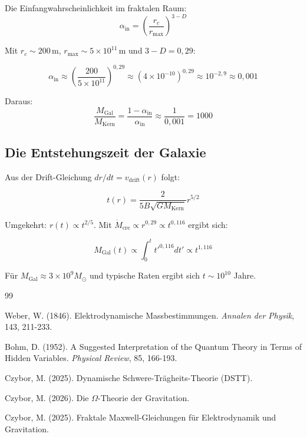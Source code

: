 \documentclass[12pt,a4paper]{article}
\begin{document}
Die Einfangwahrscheinlichkeit im fraktalen Raum:
\[
\alpha_{\text{in}} = \left( \frac{r_c}{r_{\text{max}}} \right)^{3-D}
\]

Mit $r_c \sim 200\,\text{m}$, $r_{\text{max}} \sim 5 \times 10^{11}\,\text{m}$ und $3-D = 0{,}29$:

\[
\alpha_{\text{in}} \approx \left( \frac{200}{5 \times 10^{11}} \right)^{0{,}29} \approx (4 \times 10^{-10})^{0{,}29} \approx 10^{-2{,}9} \approx 0{,}001
\]

Daraus:
\[
\frac{M_{\text{Gal}}}{M_{\text{Kern}}} = \frac{1 - \alpha_{\text{in}}}{\alpha_{\text{in}}} \approx \frac{1}{0{,}001} = 1000
\]

\subsection{Die Entstehungszeit der Galaxie}

Aus der Drift-Gleichung $dr/dt = v_{\text{drift}}(r)$ folgt:

\[
t(r) = \frac{2}{5B\sqrt{GM_{\text{Kern}}}} r^{5/2}
\]

Umgekehrt: $r(t) \propto t^{2/5}$. Mit $\dot{M}_{\text{cre}} \propto r^{0{,}29} \propto t^{0{,}116}$ ergibt sich:

\[
M_{\text{Gal}}(t) \propto \int_0^t t'^{0{,}116} dt' \propto t^{1{,}116}
\]

Für $M_{\text{Gal}} \approx 3 \times 10^9 M_\odot$ und typische Raten ergibt sich $t \sim 10^{10}$ Jahre.

\begin{thebibliography}{99}

 Weber, W. (1846). Elektrodynamische Massbestimmungen. \textit{Annalen der Physik}, 143, 211-233.

 Bohm, D. (1952). A Suggested Interpretation of the Quantum Theory in Terms of Hidden Variables. \textit{Physical Review}, 85, 166-193.

 Czybor, M. (2025). Dynamische Schwere-Trägheits-Theorie (DSTT).

 Czybor, M. (2026). Die $\Omega$-Theorie der Gravitation.

 Czybor, M. (2025). Fraktale Maxwell-Gleichungen für Elektrodynamik und Gravitation.

\end{thebibliography}
\end{document}
